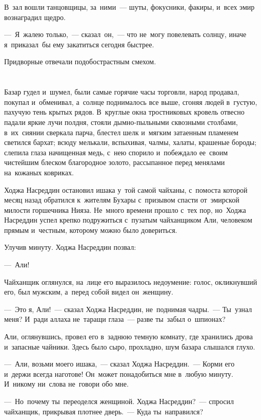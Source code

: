 \documentclass[12pt,a4paper]{book}
\begin{document}
В~зал вошли танцовщицы, за~ними~— шуты, фокусники, факиры, и~всех эмир вознаградил щедро.

—~Я~жалею только,~— сказал~он,~— что не~могу повелевать солнцу, иначе я~приказал~бы ему закатиться сегодня быстрее.

Придворные отвечали подобострастным смехом.


\chapter{}

Базар гудел и~шумел, были самые горячие часы торговли, народ продавал, покупал и~обменивал, а~солнце поднималось все выше, сгоняя людей в~густую, пахучую тень крытых рядов. В~круглые окна тростниковых кровель отвесно падали яркие лучи полдня, стояли дымно-пыльными сквозными столбами, в~их~сиянии сверкала парча, блестел шелк и~мягким затаенным пламенем светился бархат; всюду мелькали, вспыхивая, чалмы, халаты, крашеные бороды; слепила глаза начищенная медь, с~нею спорило и~побеждало ее~своим чистейшим блеском благородное золото, рассыпанное перед менялами на~кожаных ковриках.

Ходжа Насреддин остановил ишака у~той самой чайханы, с~помоста которой месяц назад обратился к~жителям Бухары с~призывом спасти от~эмирской милости горшечника Нияза. Не~много времени прошло с~тех пор, но~Ходжа Насреддин успел крепко подружиться с~пузатым чайханщиком Али, человеком прямым и~честным, которому можно было довериться.

Улучив минуту. Ходжа Насреддин позвал:

—~Али!

Чайханщик оглянулся, на~лице его выразилось недоумение: голос, окликнувший его, был мужским, а~перед собой видел он~женщину.

—~Это я, Али!~— сказал Ходжа Насреддин, не~поднимая чадры.~— Ты~узнал меня? И~ради аллаха не~таращи глаза~— разве ты~забыл о~шпионах?

Али, оглянувшись, провел его в~заднюю темную комнату, где хранились дрова и~запасные чайники. Здесь было сыро, прохладно, шум базара слышался глухо.

—~Али, возьми моего ишака,~— сказал Ходжа Насреддин.~— Корми его и~держи всегда наготове! Он~может понадобиться мне в~любую минуту. И~никому ни~слова не~говори обо мне.

—~Но~почему ты~переоделся женщиной. Ходжа Насреддин?~— спросил чайханщик, прикрывая плотнее дверь.~— Куда ты~направился?
\end{document}
